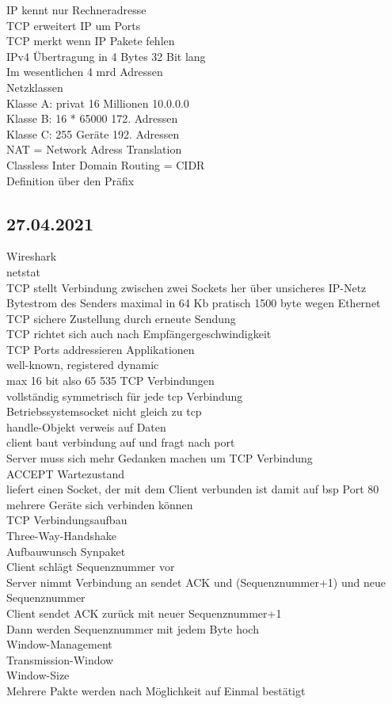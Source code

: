 \documentclass{article}
\begin{document}
	IP kennt nur Rechneradresse \\
	TCP erweitert IP um Ports \\
	TCP merkt wenn IP Pakete fehlen \\
	IPv4 Übertragung in 4 Bytes 32 Bit lang \\
	Im wesentlichen 4 mrd Adressen \\
	Netzklassen \\
	Klasse A: privat 16 Millionen 10.0.0.0 \\
	Klasse B: 16 * 65000  172. Adressen\\
	Klasse C: 255 Geräte 192. Adressen \\
	NAT = Network Adress Translation \\
	Classless Inter Domain Routing = CIDR \\
	Definition über den Präfix \\
	\subsection*{27.04.2021}
	Wireshark \\
	netstat \\
	TCP stellt Verbindung zwischen zwei Sockets her über unsicheres IP-Netz \\
	Bytestrom des Senders maximal in 64 Kb pratisch 1500 byte wegen Ethernet \\
	TCP sichere Zustellung durch erneute Sendung \\
	TCP richtet sich auch nach Empfängergeschwindigkeit \\
	TCP Ports addressieren Applikationen \\
	well-known, registered dynamic \\
	max 16 bit also 65 535 TCP Verbindungen \\
	vollständig symmetrisch für jede tcp Verbindung \\
	Betriebssystemsocket nicht gleich zu tcp \\
	handle-Objekt verweis auf Daten \\
	client baut verbindung auf und fragt nach port \\
	Server muss sich mehr Gedanken machen um TCP Verbindung \\
	ACCEPT Wartezustand \\
	liefert einen Socket, der mit dem Client verbunden ist damit auf bsp Port 80 mehrere Geräte sich verbinden können \\
	TCP Verbindungsaufbau \\
	Three-Way-Handshake \\
	Aufbauwunsch Synpaket \\
	Client schlägt Sequenznummer vor \\
	Server nimmt Verbindung an sendet ACK und (Sequenznummer+1) und neue Sequenznummer \\
	Client sendet ACK zurück mit neuer Sequenznummer+1 \\
	Dann werden Sequenznummer mit jedem Byte hoch  \\
	Window-Management \\
	Transmission-Window \\
	Window-Size \\
	Mehrere Pakte werden nach Möglichkeit auf Einmal bestätigt \\
\end{document}
